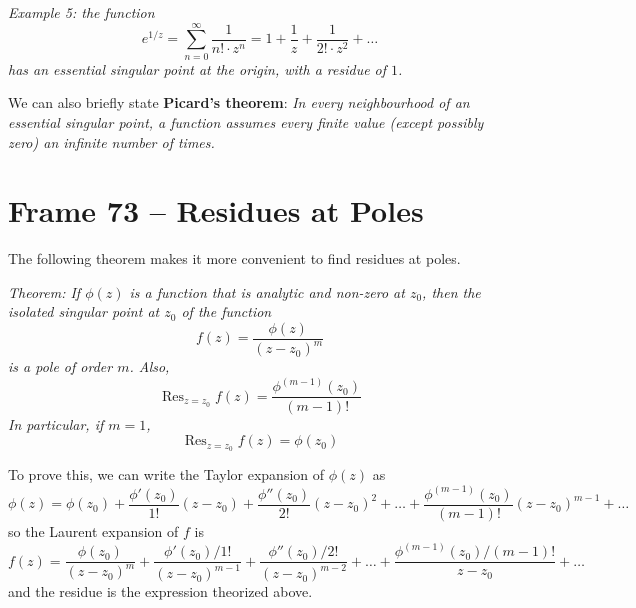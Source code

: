 \documentclass{article}
\renewcommand{\emph}{\textbf}
\DeclareMathOperator{\Res}{Res}
\begin{document}
\textit{Example 5: the function
\[
	e^{1/z}
	= \sum_{n=0}^\infty \frac{1}{n! \cdot z^n}
	= 1 + \frac{1}{z} + \frac{1}{2! \cdot z^2} + \dots
\]
has an essential singular point at the origin, with a residue of $1$.}

We can also briefly state \emph{Picard's theorem}: \textit{In every neighbourhood of an essential singular point, a function assumes every finite value (except possibly zero) an infinite number of times.}


\clearpage
\section{Frame 73 -- Residues at Poles}
The following theorem makes it more convenient to find residues at poles.

\textit{Theorem: If $\phi(z)$ is a function that is analytic and non-zero at $z_0$, then the isolated singular point at $z_0$ of the function 
\[
	f(z) = \frac{\phi(z)}{(z - z_0)^m}
\]
is a pole of order $m$. Also, 
\[
	\Res_{z = z_0} f(z) = \frac{\phi^{(m-1)}(z_0)}{(m - 1)!}
\]
In particular, if $m = 1$,
\[
	\Res_{z = z_0} f(z) = \phi(z_0)
\]}

To prove this, we can write the Taylor expansion of $\phi(z)$ as
\[
	\phi(z)
	= \phi(z_0)
	+ \frac{\phi' (z_0)}{1!} (z - z_0)
	+ \frac{\phi''(z_0)}{2!} (z - z_0)^2
	+ \dots
	+ \frac{\phi^{(m-1)}(z_0)}{(m-1)!} (z - z_0)^{m-1}
	+ \dots
\]
so the Laurent expansion of $f$ is
\[
	f(z)
	= \frac{\phi(z_0)}{(z - z_0)^m}
	+ \frac{\phi'(z_0) / 1!}{(z - z_0)^{m-1}}
	+ \frac{\phi''(z_0)/ 2!}{(z - z_0)^{m-2}}
	+ \dots
	+ \frac{\phi^{(m-1)}(z_0) / (m-1)!}{z - z_0}
	+ \dots
\]
and the residue is the expression theorized above.
\end{document}
